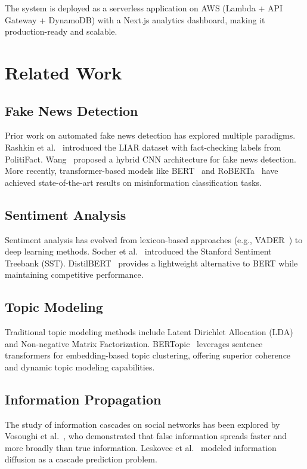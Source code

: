 \documentclass[12pt,a4paper]{article}
\begin{document}
The system is deployed as a serverless application on AWS (Lambda + API Gateway + DynamoDB) with a Next.js analytics dashboard, making it production-ready and scalable.

\section{Related Work}

\subsection{Fake News Detection}
Prior work on automated fake news detection has explored multiple paradigms. Rashkin et al.~\cite{rashkin2017} introduced the LIAR dataset with fact-checking labels from PolitiFact. Wang~\cite{wang2017} proposed a hybrid CNN architecture for fake news detection. More recently, transformer-based models like BERT~\cite{devlin2019} and RoBERTa~\cite{liu2019} have achieved state-of-the-art results on misinformation classification tasks.

\subsection{Sentiment Analysis}
Sentiment analysis has evolved from lexicon-based approaches (e.g., VADER~\cite{hutto2014}) to deep learning methods. Socher et al.~\cite{socher2013} introduced the Stanford Sentiment Treebank (SST). DistilBERT~\cite{sanh2019} provides a lightweight alternative to BERT while maintaining competitive performance.

\subsection{Topic Modeling}
Traditional topic modeling methods include Latent Dirichlet Allocation (LDA)~\cite{blei2003} and Non-negative Matrix Factorization. BERTopic~\cite{grootendorst2022} leverages sentence transformers for embedding-based topic clustering, offering superior coherence and dynamic topic modeling capabilities.

\subsection{Information Propagation}
The study of information cascades on social networks has been explored by Vosoughi et al.~\cite{vosoughi2018}, who demonstrated that false information spreads faster and more broadly than true information. Leskovec et al.~\cite{leskovec2009} modeled information diffusion as a cascade prediction problem.
\end{document}
